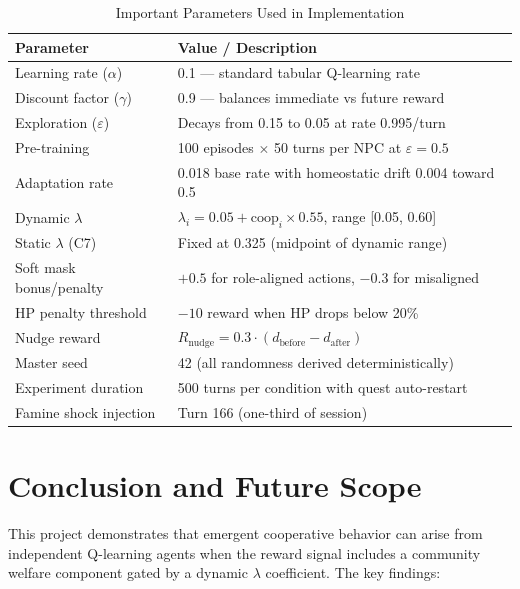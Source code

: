 \documentclass[12pt, a4paper, oneside]{report}
\begin{document}
\begin{table}[H]
\centering
\caption{Important Parameters Used in Implementation}
\label{tab:parameters}
\begin{tabularx}{\textwidth}{|l|X|}
\hline
\textbf{Parameter} & \textbf{Value / Description} \\
\hline
Learning rate ($\alpha$) & 0.1 --- standard tabular Q-learning rate \\
\hline
Discount factor ($\gamma$) & 0.9 --- balances immediate vs future reward \\
\hline
Exploration ($\varepsilon$) & Decays from 0.15 to 0.05 at rate 0.995/turn \\
\hline
Pre-training & 100 episodes $\times$ 50 turns per NPC at $\varepsilon = 0.5$ \\
\hline
Adaptation rate & 0.018 base rate with homeostatic drift 0.004 toward 0.5 \\
\hline
Dynamic $\lambda$ & $\lambda_i = 0.05 + \text{coop}_i \times 0.55$, range [0.05, 0.60] \\
\hline
Static $\lambda$ (C7) & Fixed at 0.325 (midpoint of dynamic range) \\
\hline
Soft mask bonus/penalty & $+0.5$ for role-aligned actions, $-0.3$ for misaligned \\
\hline
HP penalty threshold & $-10$ reward when HP drops below 20\% \\
\hline
Nudge reward & $R_{\text{nudge}} = 0.3 \cdot (d_{\text{before}} - d_{\text{after}})$ \\
\hline
Master seed & 42 (all randomness derived deterministically) \\
\hline
Experiment duration & 500 turns per condition with quest auto-restart \\
\hline
Famine shock injection & Turn 166 (one-third of session) \\
\hline
\end{tabularx}
\end{table}

\chapter{Conclusion and Future Scope}
\label{chap:conclusion}

This project demonstrates that emergent cooperative behavior can arise from independent Q-learning agents when the reward signal includes a community welfare component gated by a dynamic $\lambda$ coefficient. The key findings:
\end{document}
